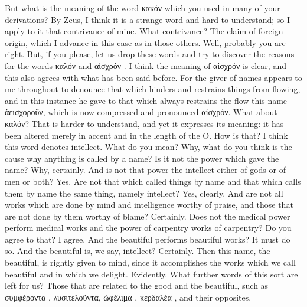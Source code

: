 {{{{{\hermogenesspeaks
But what is the meaning of the word κακόν which you used in many of your derivations?
\socratesspeaks
By Zeus, I think it is a strange word and hard to understand; so I apply to it that contrivance of mine.
\hermogenesspeaks
What contrivance?
\socratesspeaks
The claim of foreign origin, which I advance in this case as in those others.
\hermogenesspeaks
Well, probably you are right. But, if you please, let us drop these words and try to discover the reasons for the words καλόν  and αἰσχρόν .
\socratesspeaks
I think the meaning of αἰσχρόν is clear,  and this also agrees with what has been said before. For the giver of names appears to me throughout to denounce that which hinders and restrains things from flowing, and in this instance he gave to that which always restrains the flow  this name ἀεισχοροῦν, which is now compressed and pronounced αἰσχρόν.
\hermogenesspeaks
What about καλόν?
\socratesspeaks
That is harder to understand, and yet it expresses its meaning: it has been altered merely in accent and in the length of the O. 
\hermogenesspeaks
How is that?
\socratesspeaks
I think this word denotes intellect.
\hermogenesspeaks
What do you mean?
\socratesspeaks
Why, what do you think is the cause why anything is called by a name? Is it not the power which gave the name?
\hermogenesspeaks
Why, certainly.
\socratesspeaks
And is not that power the intellect either of gods or of men or both?
\hermogenesspeaks
Yes.
\socratesspeaks
Are not that which called things by name and that which calls them by name  the same thing, namely intellect?
\hermogenesspeaks
Yes, clearly.
\socratesspeaks
And are not all works which are done by mind and intelligence worthy of praise, and those that are not done by them worthy of blame?
\hermogenesspeaks
Certainly. 
\socratesspeaks
Does not the medical power perform medical works and the power of carpentry works of carpentry? Do you agree to that?
\hermogenesspeaks
I agree.
\socratesspeaks
And the beautiful performs beautiful works?
\hermogenesspeaks
It must do so.
\socratesspeaks
And the beautiful is, we say, intellect?
\hermogenesspeaks
Certainly.
\socratesspeaks
Then this name, the beautiful, is rightly given to mind, since it accomplishes the works which we call beautiful and in which we delight.
\hermogenesspeaks
Evidently. 
\socratesspeaks
What further words of this sort are left for us?
\hermogenesspeaks
Those that are related to the good and the beautiful,  such as συμφέροντα , λυσιτελοῦντα, ὠφέλιμα , κερδαλέα , and their opposites.
}}}}}
